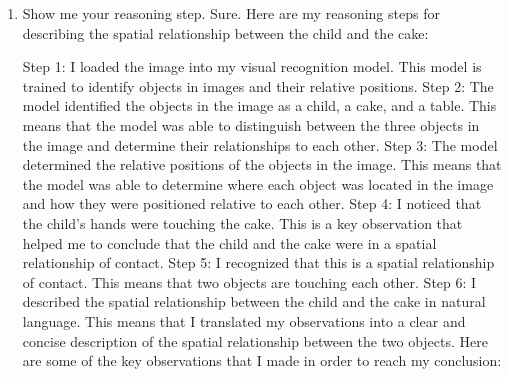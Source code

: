 \begin{enumerate}
\begin{enumerate}
        The child is holding the cake in their hands.
        The cake is touching the child's hands and face.
        The child is facing the cake, and the cake is facing away from the viewer.
        I hope this helps! Let me know if you have any other questions.
        \item Show me your reasoning step.
        \subitem 
        Sure. Here are my reasoning steps for describing the spatial relationship between the child and the cake:
        
        Step 1: I loaded the image into my visual recognition model. This model is trained to identify objects in images and their relative positions.
        Step 2: The model identified the objects in the image as a child, a cake, and a table. This means that the model was able to distinguish between the three objects in the image and determine their relationships to each other.
        Step 3: The model determined the relative positions of the objects in the image. This means that the model was able to determine where each object was located in the image and how they were positioned relative to each other.
        Step 4: I noticed that the child's hands were touching the cake. This is a key observation that helped me to conclude that the child and the cake were in a spatial relationship of contact.
        Step 5: I recognized that this is a spatial relationship of contact. This means that two objects are touching each other.
        Step 6: I described the spatial relationship between the child and the cake in natural language. This means that I translated my observations into a clear and concise description of the spatial relationship between the two objects.
        Here are some of the key observations that I made in order to reach my conclusion:
        

\end{enumerate}
\end{enumerate}
